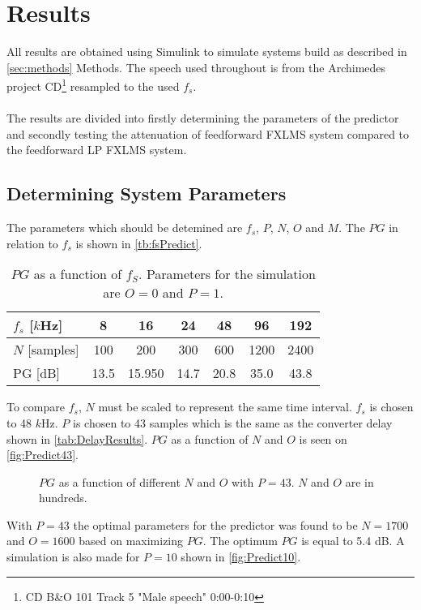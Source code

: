\section{Results}
All results are obtained using Simulink\textsuperscript{\textregistered} to simulate systems build as described in \autoref{sec:methods} Methods. The speech used throughout is from the Archimedes project CD\footnote{CD B\&O 101 Track 5 "Male speech" 0:00-0:10} resampled to the used $f_s$.  
\\\\
The results are divided into firstly determining the parameters of the predictor and secondly testing the attenuation of feedforward FXLMS system compared to the feedforward LP FXLMS system.   

\subsection{Determining System Parameters}
The parameters which should be detemined are $f_s$, $P$, $N$, $O$ and $M$.         
The $PG$ in relation to $f_s$ is shown in \autoref{tb:fsPredict}.

\begin{table}[H]
\centering
\begin{tabular}{|l|c|c|c|c|c|c|}
\hline
$f_s$ {[}$k$Hz{]} & 8 & 16 & 24 & 48 & 96 & 192 \\ \hline 
$N$ {[}samples{]} & 100 & 200 & 300 & 600 & 1200 & 2400 \\ \hline 
PG {[}dB{]} & 13.5 & 15.950 & 14.7 & 20.8 & 35.0 & 43.8 \\ \hline
\end{tabular}
\caption{$PG$ as a function of $f_S$. Parameters for the simulation are $O=0$ and $P=1$.}
\label{tb:fsPredict}
\end{table}

To compare $f_s$, $N$ must be scaled to represent the same time interval. $f_s$ is chosen to 48 $k$Hz. $P$ is chosen to 43 samples which is the same as the converter delay shown in \autoref{tab:DelayResults}.  
$PG$ as a function of $N$ and $O$ is seen on \autoref{fig:Predict43}. 

\begin{figure}[H]
	\centering
	
	\caption{$PG$ as a function of different $N$ and $O$ with $P=43$. $N$ and $O$ are in hundreds.}
	\label{fig:Predict43}
\end{figure}
With $P=43$ the optimal parameters for the predictor was found to be $N=1700$ and $O=1600$ based on maximizing $PG$. The optimum $PG$ is equal to 5.4 dB.
A simulation is also made for $P=10$ shown in \autoref{fig:Predict10}.

